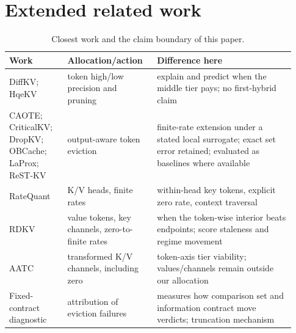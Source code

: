 \section{Extended related work}
\label{app:related}

\begin{table}[h]
\centering
\footnotesize
\setlength{\tabcolsep}{3pt}
\caption{Closest work and the claim boundary of this paper.}
\label{tab:related}
\begin{tabular}{@{}p{0.19\linewidth}p{0.29\linewidth}p{0.45\linewidth}@{}}
\toprule
\textbf{Work} & \textbf{Allocation/action} & \textbf{Difference here} \\
\midrule
DiffKV; HqeKV & token high/low precision and pruning & explain and predict when the middle tier pays; no first-hybrid claim \\
CAOTE; CriticalKV; DropKV; OBCache; LaProx; ReST-KV & output-aware token eviction & finite-rate extension under a stated local surrogate; exact set error retained; evaluated as baselines where available \\
RateQuant & K/V heads, finite rates & within-head key tokens, explicit zero rate, context traversal \\
RDKV  & value tokens, key channels, zero-to-finite rates & when the token-wise interior beats endpoints; score staleness and regime movement \\
AATC  & transformed K/V channels, including zero & token-axis tier viability; values/channels remain outside our allocation \\
Fixed-contract diagnostic & attribution of eviction failures & measures how comparison set and information contract move verdicts; truncation mechanism \\
\bottomrule
\end{tabular}
\end{table}

